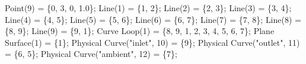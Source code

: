 \documentclass[11pt]{article}
\newenvironment{Shaded}{}{}
\newcommand{\DecValTok}[1]{\textcolor[rgb]{0.25,0.63,0.44}{{#1}}}
\newcommand{\FloatTok}[1]{\textcolor[rgb]{0.25,0.63,0.44}{{#1}}}
\newcommand{\StringTok}[1]{\textcolor[rgb]{0.25,0.44,0.63}{{#1}}}
\newcommand{\NormalTok}[1]{{#1}}
\newcommand{\OperatorTok}[1]{\textcolor[rgb]{0.40,0.40,0.40}{{#1}}}
\begin{document}
\begin{Shaded}
\begin{Highlighting}[]
\NormalTok{Point}\OperatorTok{(}\DecValTok{9}\OperatorTok{)} \OperatorTok{=} \OperatorTok{\{}\DecValTok{0}\OperatorTok{,} \DecValTok{3}\OperatorTok{,} \DecValTok{0}\OperatorTok{,} \FloatTok{1.0}\OperatorTok{\};}
\NormalTok{Line}\OperatorTok{(}\DecValTok{1}\OperatorTok{)} \OperatorTok{=} \OperatorTok{\{}\DecValTok{1}\OperatorTok{,} \DecValTok{2}\OperatorTok{\};}
\NormalTok{Line}\OperatorTok{(}\DecValTok{2}\OperatorTok{)} \OperatorTok{=} \OperatorTok{\{}\DecValTok{2}\OperatorTok{,} \DecValTok{3}\OperatorTok{\};}
\NormalTok{Line}\OperatorTok{(}\DecValTok{3}\OperatorTok{)} \OperatorTok{=} \OperatorTok{\{}\DecValTok{3}\OperatorTok{,} \DecValTok{4}\OperatorTok{\};}
\NormalTok{Line}\OperatorTok{(}\DecValTok{4}\OperatorTok{)} \OperatorTok{=} \OperatorTok{\{}\DecValTok{4}\OperatorTok{,} \DecValTok{5}\OperatorTok{\};}
\NormalTok{Line}\OperatorTok{(}\DecValTok{5}\OperatorTok{)} \OperatorTok{=} \OperatorTok{\{}\DecValTok{5}\OperatorTok{,} \DecValTok{6}\OperatorTok{\};}
\NormalTok{Line}\OperatorTok{(}\DecValTok{6}\OperatorTok{)} \OperatorTok{=} \OperatorTok{\{}\DecValTok{6}\OperatorTok{,} \DecValTok{7}\OperatorTok{\};}
\NormalTok{Line}\OperatorTok{(}\DecValTok{7}\OperatorTok{)} \OperatorTok{=} \OperatorTok{\{}\DecValTok{7}\OperatorTok{,} \DecValTok{8}\OperatorTok{\};}
\NormalTok{Line}\OperatorTok{(}\DecValTok{8}\OperatorTok{)} \OperatorTok{=} \OperatorTok{\{}\DecValTok{8}\OperatorTok{,} \DecValTok{9}\OperatorTok{\};}
\NormalTok{Line}\OperatorTok{(}\DecValTok{9}\OperatorTok{)} \OperatorTok{=} \OperatorTok{\{}\DecValTok{9}\OperatorTok{,} \DecValTok{1}\OperatorTok{\};}
\NormalTok{Curve Loop}\OperatorTok{(}\DecValTok{1}\OperatorTok{)} \OperatorTok{=} \OperatorTok{\{}\DecValTok{8}\OperatorTok{,} \DecValTok{9}\OperatorTok{,} \DecValTok{1}\OperatorTok{,} \DecValTok{2}\OperatorTok{,} \DecValTok{3}\OperatorTok{,} \DecValTok{4}\OperatorTok{,} \DecValTok{5}\OperatorTok{,} \DecValTok{6}\OperatorTok{,} \DecValTok{7}\OperatorTok{\};}
\NormalTok{Plane Surface}\OperatorTok{(}\DecValTok{1}\OperatorTok{)} \OperatorTok{=} \OperatorTok{\{}\DecValTok{1}\OperatorTok{\};}
\NormalTok{Physical Curve}\OperatorTok{(}\StringTok{"inlet"}\OperatorTok{,} \DecValTok{10}\OperatorTok{)} \OperatorTok{=} \OperatorTok{\{}\DecValTok{9}\OperatorTok{\};}
\NormalTok{Physical Curve}\OperatorTok{(}\StringTok{"outlet"}\OperatorTok{,} \DecValTok{11}\OperatorTok{)} \OperatorTok{=} \OperatorTok{\{}\DecValTok{6}\OperatorTok{,} \DecValTok{5}\OperatorTok{\};}
\NormalTok{Physical Curve}\OperatorTok{(}\StringTok{"ambient"}\OperatorTok{,} \DecValTok{12}\OperatorTok{)} \OperatorTok{=} \OperatorTok{\{}\DecValTok{7}\OperatorTok{\};}

\end{Highlighting}
\end{Shaded}
\end{document}

